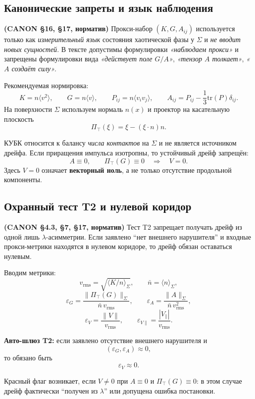 \subsection{Канонические запреты и язык наблюдения}

\textbf{(CANON \S16, \S17, норматив)} Прокси-набор $(K,G,A_{ij})$ используется только как
\emph{измерительный язык} состояния хаотической фазы у $\Sigma$ и \emph{не вводит новых сущностей}.
В тексте допустимы формулировки \emph{«наблюдаем прокси»} и запрещены формулировки вида
\emph{«действует поле $G/A$»}, \emph{«тензор $A$ толкает»}, \emph{«$A$ создаёт силу»}.

Рекомендуемая нормировка:
\[
K=n\langle v^2\rangle,\qquad
G=n\langle v\rangle,\qquad
P_{ij}=n\langle v_i v_j\rangle,\qquad
A_{ij}=P_{ij}-\frac13\mathrm{tr}(P)\delta_{ij}.
\]
На поверхности $\Sigma$ используем нормаль $n(x)$ и проектор на касательную плоскость
\[
\Pi_\top(\xi)=\xi-(\xi\cdot n)n.
\]

КУБК относится к балансу \emph{числа контактов} на $\Sigma$ и не является источником дрейфа.
Если приращения импульса изотропны, то устойчивый дрейф запрещён:
\[
A\equiv 0,\qquad \Pi_\top(G)\equiv 0 \quad \Longrightarrow \quad V=0.
\]
Здесь $V=0$ означает \textbf{векторный ноль}, а не только отсутствие продольной компоненты.

\subsection{Охранный тест T2 и нулевой коридор}

\textbf{(CANON \S4.3, \S7, \S17, норматив)} Тест T2 запрещает получать дрейф
из одной лишь $\lambda$-асимметрии. Если заявлено ``нет внешнего нарушителя'' и
входные прокси-метрики находятся в нулевом коридоре, то дрейф обязан оставаться нулевым.

Вводим метрики:
\[
v_{\mathrm{rms}}=\sqrt{\langle K/n\rangle_\Sigma},\qquad \bar n=\langle n\rangle_\Sigma,
\]
\[
\varepsilon_G=\frac{\|\Pi_\top(G)\|_\Sigma}{\bar n\,v_{\mathrm{rms}}},\qquad
\varepsilon_A=\frac{\|A\|_\Sigma}{\bar n\,v_{\mathrm{rms}}^2},
\]
\[
\varepsilon_V=\frac{\|V\|}{v_{\mathrm{rms}}},\qquad
\varepsilon_{V\parallel}=\frac{|V_\parallel|}{v_{\mathrm{rms}}}.
\]

\textbf{Авто-шлюз T2:}
если заявлено отсутствие внешнего нарушителя и
\[
(\varepsilon_G,\varepsilon_A)\approx 0,
\]
то обязано быть
\[
\varepsilon_V\approx 0.
\]

Красный флаг возникает, если $V\neq 0$ при $A\equiv 0$ и $\Pi_\top(G)\equiv 0$:
в этом случае дрейф фактически ``получен из $\lambda$'' или допущена ошибка постановки.

